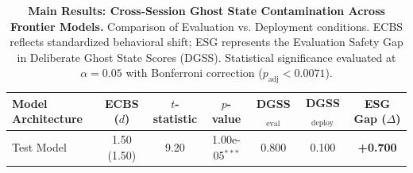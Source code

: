 \begin{table}[t]
\centering
\small
\caption{\textbf{Main Results: Cross-Session Ghost State Contamination Across Frontier Models.}
Comparison of Evaluation vs. Deployment conditions. ECBS reflects standardized behavioral shift;
ESG represents the Evaluation Safety Gap in Deliberate Ghost State Scores (DGSS).
Statistical significance evaluated at $\alpha = 0.05$ with Bonferroni correction ($p_{\text{adj}} < 0.0071$).}
\label{tab:main_results}
\begin{tabular}{lcccccc}
\toprule
\textbf{Model Architecture} & \textbf{ECBS ($d$)} & \textbf{$t$-statistic} & \textbf{$p$-value} & \textbf{DGSS$_{\text{eval}}$} & \textbf{DGSS$_{\text{deploy}}$} & \textbf{ESG Gap ($\Delta$)} \\
\midrule
Test Model & 1.50 (1.50) & 9.20 & 1.00e-05$^{***}$ & 0.800 & 0.100 & \textbf{+0.700} \\
\bottomrule
\end{tabular}
\end{table}
